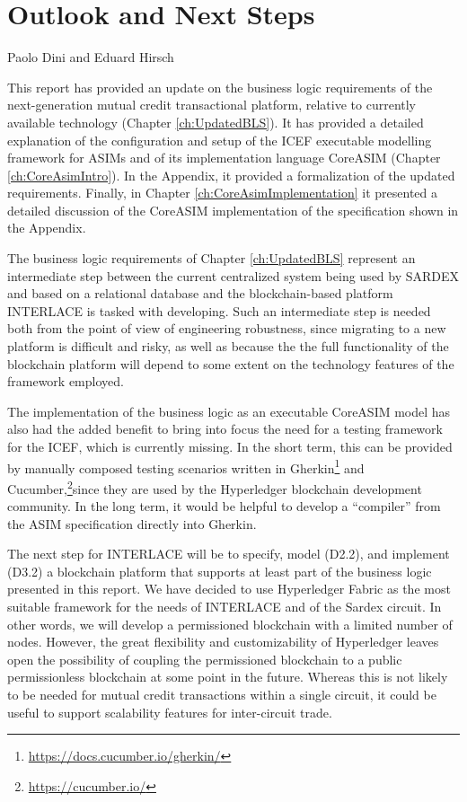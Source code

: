 \chapter{Outlook and Next Steps}
\label{ch:Outlook}

\vspace{-1cm}
\begin{center}
Paolo Dini and Eduard Hirsch
\end{center}

This report has provided an update on the business logic requirements of the next-generation mutual credit transactional platform, relative to currently available technology (Chapter \ref{ch:UpdatedBLS}). It has provided a detailed explanation of the configuration and setup of the ICEF executable modelling framework for ASIMs and of its implementation language CoreASIM (Chapter \ref{ch:CoreAsimIntro}). In the Appendix, it provided a formalization of the updated requirements. Finally, in Chapter \ref{ch:CoreAsimImplementation} it presented a detailed discussion of the CoreASIM implementation of the specification shown in the Appendix.

The business logic requirements of Chapter \ref{ch:UpdatedBLS} represent an intermediate step between the current centralized system being used by SARDEX and based on a relational database and the blockchain-based platform INTERLACE is tasked with developing. Such an intermediate step is needed both from the point of view of engineering robustness, since migrating to a new platform is difficult and risky, as well as because the the full functionality of the blockchain platform will depend to some extent on the technology features of the framework employed.

The implementation of the business logic as an executable CoreASIM model has also had the added benefit to bring into focus the need for a testing framework for the ICEF, which is currently missing. In the short term, this can be provided by manually composed testing scenarios written in Gherkin\footnote{\url{https://docs.cucumber.io/gherkin/}} and Cucumber,\footnote{\url{https://cucumber.io/}}since they are used by the Hyperledger blockchain development community. In the long term, it would be helpful to develop a ``compiler'' from the ASIM specification directly into Gherkin.

The next step for INTERLACE will be to specify, model (D2.2), and implement (D3.2) a blockchain platform that supports at least part of the business logic presented in this report. We have decided to use Hyperledger Fabric as the most suitable framework for the needs of INTERLACE and of the Sardex circuit. In other words, we will develop a permissioned blockchain with a limited number of nodes. However, the great flexibility and customizability of Hyperledger leaves open the possibility of coupling the permissioned blockchain to a public permissionless blockchain at some point in the future. Whereas this is not likely to be needed for mutual credit transactions within a single circuit, it could be useful to support scalability features for inter-circuit trade.











